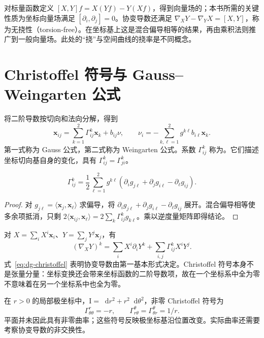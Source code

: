 \documentclass[UTF8,12pt,a4paper,fontset=fandol]{ctexbook}
\newcommand{\dd}{\mathop{}\!\mathrm d}
\newcommand{\ip}[2]{\langle #1,#2\rangle}
\begin{document}
对标量函数定义 $[X,Y]f=X(Yf)-Y(Xf)$，得到向量场的；本书所需的关键性质为坐标向量场满足 $[\partial_i,\partial_j]=0$。协变导数还满足 $\nabla_XY-\nabla_YX=[X,Y]$，称为无挠性（torsion-free）。在坐标基上这是混合偏导相等的结果，再由乘积法则推广到一般向量场。此处的“挠”与空间曲线的挠率是不同概念。

\section{Christoffel 符号与 Gauss--Weingarten 公式}
将二阶导数按切向和法向分解，得到
\begin{equation}
 \mathbf x_{ij}=\sum_{k=1}^2\Gamma^k_{ij}\mathbf x_k+b_{ij}\nu,
 \qquad
 \nu_i=-\sum_{k,\ell=1}^2g^{k\ell}b_{i\ell}\mathbf x_k.
 \label{eq:dg-gauss-weingarten}
\end{equation}
第一式称为 Gauss 公式，第二式称为 Weingarten 公式。系数 $\Gamma^k_{ij}$ 称为。它们描述坐标切向基自身的变化，具有 $\Gamma^k_{ij}=\Gamma^k_{ji}$。

\begin{proposition}
\begin{equation}
 \Gamma^k_{ij}=\frac12\sum_{\ell=1}^2g^{k\ell}
 (\partial_i g_{j\ell}+\partial_jg_{i\ell}-\partial_\ell g_{ij}).
 \label{eq:dg-christoffel}
\end{equation}
\end{proposition}
\begin{proof}
对 $g_{j\ell}=\ip{\mathbf x_j}{\mathbf x_\ell}$ 求偏导，将 $\partial_i g_{j\ell}+\partial_jg_{i\ell}-\partial_\ell g_{ij}$ 展开。混合偏导相等使多余项抵消，只剩 $2\ip{\mathbf x_{ij}}{\mathbf x_\ell}=2\sum_k\Gamma^k_{ij}g_{k\ell}$。乘以逆度量矩阵即得结论。
\end{proof}
对 $X=\sum_iX^i\mathbf x_i$、$Y=\sum_jY^j\mathbf x_j$，有
\begin{equation}
 (\nabla_XY)^k=\sum_iX^i\partial_iY^k+
 \sum_{i,j}\Gamma^k_{ij}X^iY^j.
 \label{eq:dg-covariant-coordinates}
\end{equation}
式~\eqref{eq:dg-christoffel} 表明协变导数由第一基本形式决定。Christoffel 符号本身不是张量分量：坐标变换还会带来坐标函数的二阶导数项，故在一个坐标系中全为零不意味着在另一个坐标系中也全为零。

\begin{example}[平面的极坐标]
在 $r>0$ 的局部极坐标中，$\mathrm I=\dd r^2+r^2\dd\theta^2$，非零 Christoffel 符号为
\[
 \Gamma^r_{\theta\theta}=-r,\qquad
 \Gamma^\theta_{r\theta}=\Gamma^\theta_{\theta r}=1/r.
\]
平面并未因此具有非零曲率；这些符号反映极坐标基沿位置改变。实际曲率还需要考察协变导数的非交换性。
\end{example}
\end{document}
